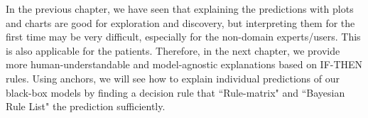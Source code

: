 \hspace*{3.5mm} In the previous chapter, we have seen that explaining the predictions with plots and charts are good for exploration and discovery, but interpreting them for the first time may be very difficult, especially for the non-domain experts/users. This is also applicable for the patients. Therefore, in the next chapter, we provide more human-understandable and model-agnostic explanations based on IF-THEN rules. Using anchors, we will see how to explain individual predictions of our black-box models by finding a decision rule that ``Rule-matrix" and ``Bayesian Rule List" the prediction sufficiently. 

